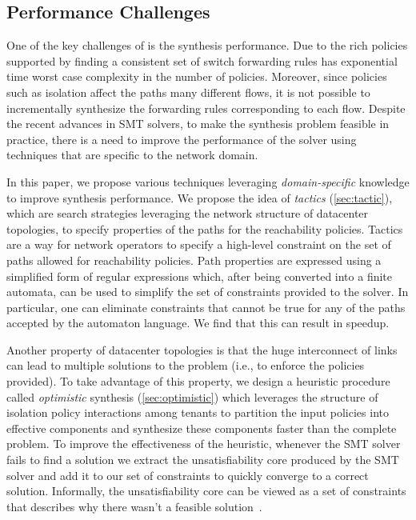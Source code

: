 \subsection{Performance Challenges} \label{sec:performance}

One of the key challenges of \Name is the synthesis
performance. 
Due to the rich  policies supported by \Name
finding a consistent set of switch forwarding rules 
has exponential time worst case complexity in
the number of policies.
Moreover, since policies such as isolation affect
the paths many different flows, it is not possible to incrementally synthesize
the forwarding rules corresponding to each flow. 
Despite the recent advances in SMT solvers, to make
the synthesis problem feasible in practice,
there is a need to improve the performance of the solver
using techniques that are specific to the network domain.


In this paper, we propose various techniques leveraging
\emph{domain-specific} knowledge to improve synthesis performance. We
propose the idea of \emph{tactics} (\cref{sec:tactic}), which are
search strategies leveraging the network structure of datacenter
topologies, to specify properties of the paths for the reachability
policies.  Tactics are a way for network operators to specify a
high-level constraint on the set of paths allowed for reachability
policies.  Path properties are expressed using a simplified form of
regular expressions which, after being converted into a finite
automata, can be used to simplify the set of constraints provided to
the solver.  In particular, one can eliminate constraints that cannot
be true for any of the paths accepted by the automaton language. We
find that this can result in  speedup.  


Another property of datacenter topologies is that the huge
interconnect of links can lead to multiple solutions to the problem
(i.e., to enforce the policies provided).  To take advantage of this
property, we design a heuristic procedure called \emph{optimistic}
synthesis (\cref{sec:optimistic}) which leverages the structure of
isolation policy interactions among tenants to partition the input
policies into effective components and synthesize these components
faster than the complete problem. To improve the effectiveness of the
heuristic, whenever the SMT solver fails to find a solution we extract
the unsatisfiability core produced by the SMT solver and 
add it to our set of constraints to quickly converge to a correct solution.
Informally, the unsatisfiability core can be viewed
as a set of constraints that describes why there wasn't a feasible solution~\cite{}. 

